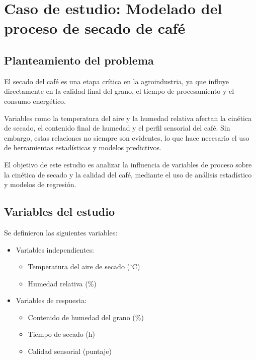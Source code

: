 \section{Caso de estudio: Modelado del proceso de secado de café}

\subsection{Planteamiento del problema}

El secado del café es una etapa crítica en la agroindustria, ya que influye directamente en la calidad final del grano, el tiempo de procesamiento y el consumo energético.

Variables como la temperatura del aire y la humedad relativa afectan la cinética de secado, el contenido final de humedad y el perfil sensorial del café. Sin embargo, estas relaciones no siempre son evidentes, lo que hace necesario el uso de herramientas estadísticas y modelos predictivos.

El objetivo de este estudio es analizar la influencia de variables de proceso sobre la cinética de secado y la calidad del café, mediante el uso de análisis estadístico y modelos de regresión.

\subsection{Variables del estudio}

Se definieron las siguientes variables:

\begin{itemize}
    \item Variables independientes:
    \begin{itemize}
        \item Temperatura del aire de secado ($^\circ$C)
        \item Humedad relativa (\%)
    \end{itemize}
    
    \item Variables de respuesta:
    \begin{itemize}
        \item Contenido de humedad del grano (\%)
        \item Tiempo de secado (h)
        \item Calidad sensorial (puntaje)
    \end{itemize}
\end{itemize}

